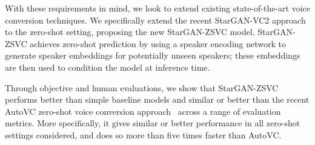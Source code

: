 With these requirements in mind, we look to extend existing state-of-the-art voice conversion techniques.
We specifically extend the recent StarGAN-VC2 \cite{stargan-vc2} approach to the zero-shot setting, proposing the new StarGAN-ZSVC model.
StarGAN-ZSVC achieves zero-shot prediction by using a speaker encoding network to generate speaker embeddings for potentially unseen speakers; these embeddings are then used to condition the model at inference time.
  
Through objective and human evaluations, we show that StarGAN-ZSVC performs better than simple baseline models and similar or better than the recent AutoVC zero-shot voice conversion approach~\cite{autovc} across a range of evaluation metrics.
More specifically, it gives similar or better performance in all zero-shot settings considered, and does so more than five times faster than AutoVC.

